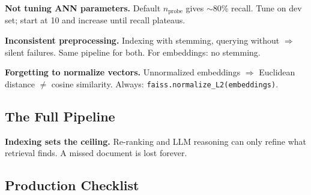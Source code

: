 \documentclass[11pt,a4paper]{article}
\theoremstyle{definition}
\theoremstyle{plain}
\begin{document}
\begin{pitfall}
\textbf{Not tuning ANN parameters.} Default $n_{\mathrm{probe}}$ gives $\sim$80\% recall. Tune on dev set; start at 10 and increase until recall plateaus.
\end{pitfall}

\begin{pitfall}
\textbf{Inconsistent preprocessing.} Indexing with stemming, querying without $\Rightarrow$ silent failures. Same pipeline for both. For embeddings: no stemming.
\end{pitfall}

\begin{pitfall}
\textbf{Forgetting to normalize vectors.} Unnormalized embeddings $\Rightarrow$ Euclidean distance $\neq$ cosine similarity. Always: \texttt{faiss.normalize\_L2(embeddings)}.
\end{pitfall}

\subsection{The Full Pipeline}

\begin{center}

\end{center}

\begin{keytakeaway}
\textbf{Indexing sets the ceiling.} Re-ranking and LLM reasoning can only refine what retrieval finds. A missed document is lost forever.
\end{keytakeaway}

\subsection{Production Checklist}
\end{document}
